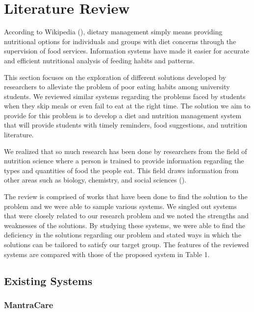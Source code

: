 \documentclass{article}
\begin{document}
\section{Literature Review}

According to Wikipedia (\citeyear{wikipedia2019dietary}), dietary management simply means providing nutritional options for individuals and groups with diet concerns through the supervision of food services. Information systems have made it easier for accurate and efficient nutritional analysis of feeding habits and patterns.

This section focuses on the exploration of different solutions developed by researchers to alleviate the problem of poor eating habits among university students. We reviewed similar systems regarding the problems faced by students when they skip meals or even fail to eat at the right time. The solution we aim to provide for this problem is to develop a diet and nutrition management system that will provide students with timely reminders, food suggestions, and nutrition literature.

We realized that so much research has been done by researchers from the field of nutrition science where a person is trained to provide information regarding the types and quantities of food the people eat. This field draws information from other areas such as biology, chemistry, and social sciences (\cite{sriram2020hire}).

The review is comprised of works that have been done to find the solution to the problem and we were able to sample various systems. We singled out systems that were closely related to our research problem and we noted the strengths and weaknesses of the solutions. By studying these systems, we were able to find the deficiency in the solutions regarding our problem and stated ways in which the solutions can be tailored to satisfy our target group. The features of the reviewed systems are compared with those of the proposed system in Table 1.

\subsection{Existing Systems}

\subsubsection{MantraCare}
\end{document}
